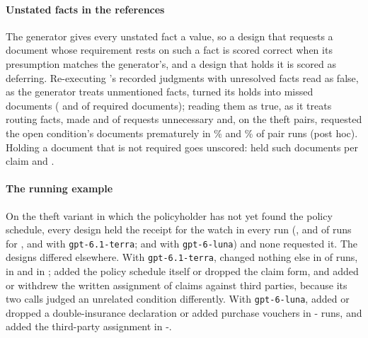 \paragraph{Unstated facts in the references}
The generator gives every unstated fact a value, so a design that requests a document whose requirement rests on such a fact is scored correct when its presumption matches the generator's, and a design that holds it is scored as deferring. Re-executing \casepath's recorded judgments with unresolved facts read as false, as the generator treats unmentioned facts, turned its holds into missed documents (\pct{\tvTerraClosedMiss} and \pct{\tvLunaClosedMiss} of required documents); reading them as true, as it treats routing facts, made \pct{\tvTerraEagerUnnec} and \pct{\tvLunaEagerUnnec} of requests unnecessary and, on the theft pairs, requested the open condition's documents prematurely in \tvThTerraEagerPremature\% and \tvThLunaEagerPremature\% of pair runs (post hoc). Holding a document that is not required goes unscored:  held \tenTerraBoneHoldsNonreq{} such documents per claim and \casepath \tenTerraCPxHoldsNonreq.

\paragraph{The running example}
On the theft variant in which the policyholder has not yet found the policy schedule, every design held the receipt for the watch in every run (\watchTerraDHeld, \watchTerraRHeld{} and \watchTerraCPHeld{} of \watchTerraRRuns{} runs for ,  and \casepath with \texttt{gpt-6.1-terra}; \watchLunaRHeld{} and \watchLunaCPHeld{} with \texttt{gpt-6-luna}) and none requested it. The designs differed elsewhere. With \texttt{gpt-6.1-terra},  changed nothing else in \watchTerraRStable{} of \watchTerraRRuns{} runs, \casepath in \watchTerraCPStable{} and  in \watchTerraDStable;  added the policy schedule itself or dropped the claim form, and \casepath added or withdrew the written assignment of claims against third parties, because its two calls judged an unrelated condition differently. With \texttt{gpt-6-luna},  added or dropped a double-insurance declaration or added purchase vouchers in \the\numexpr\watchLunaRRuns-\watchLunaRStable\relax{} runs, and \casepath added the third-party assignment in \the\numexpr\watchLunaCPRuns-\watchLunaCPStable\relax.

